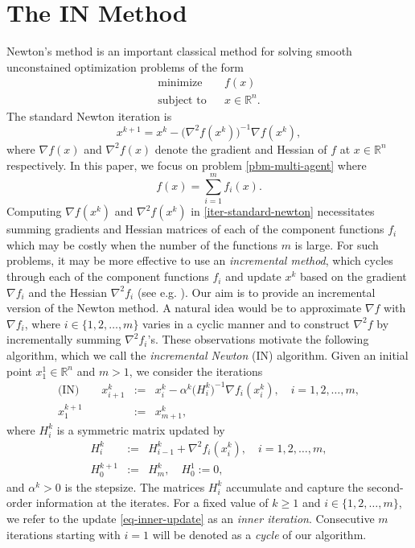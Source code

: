 \documentclass[final,numbook]{svjour3}
\begin{document}
\section{The IN Method}
\label{sec:incr-gauss-newton}
Newton's method is an important classical method for solving smooth unconstained optimization problems of the form   
  \begin{eqnarray*}\mbox{minimize  }&& f(x)  \\
	\mbox{subject to}&& x \in {\mathbb R}^n. \nonumber 
   \end{eqnarray*}
The standard Newton iteration is
  \begin{equation}\label{iter-standard-newton} x^{k+1} = x^k - \big(\nabla^2 f(x^k)\big)^{-1} \nabla f(x^k),
  \end{equation}
where $\nabla f(x)$ and $\nabla^2 f(x)$ denote the gradient and Hessian of $f$ at $x \in {\mathbb R}^n$ respectively. In this paper, we focus on problem \eqref{pbm-multi-agent} where  
  $$ f(x) = \sum_{i=1}^m f_i(x).$$
Computing $\nabla f(x^k)$ and $\nabla^2 f(x^k)$ in \eqref{iter-standard-newton}
necessitates summing gradients and Hessian matrices of each of the component functions $f_i$ which may be costly when the number of the functions $m$ is large. For such problems, it may be more effective to use an \textit{incremental method}, which cycles through each of the component functions $f_i$ and update $x^k$ based on the gradient $\nabla f_i$ and the Hessian $\nabla^2 f_i$ (see e.g. \cite{Bertsekas99nonlinear}).  
Our aim is to provide an incremental version of the Newton method. 
A natural idea would be to approximate $\nabla f$ with $\nabla f_i$, where $i \in \{1,2,\dots,m\}$ varies in a cyclic manner and to construct $\nabla^2 f$ by incrementally summing $\nabla^2 f_i$'s. These observations motivate the following algorithm, which we call the \textit{incremental Newton} (IN) algorithm. Given an initial point $x_1^1 \in {\mathbb R}^n$ and $m>1$, we consider the iterations   
      \begin{eqnarray}\label{eq-inner-update} \mbox{(IN)} \quad \quad x_{i+1}^k &:=& x_i^k - \alpha^k \big( H_i^k \big)^{-1}  \nabla f_i(x_i^k), \quad i = 1, 2, \dots,m, \\
	x_1^{k+1} &:=& x_{m+1}^k, \label{eq-inner-update-convention}
	\end{eqnarray}
where $H_i^k$ is a symmetric matrix updated by 
\begin{eqnarray} \label{eq-hessian-update} H_i^k &:=&  H_{i-1}^k + \nabla^2 f_i(x_i^k), \quad i = 1, 2, \dots,m,\\
     H_0^{k+1} &:=& H_{m}^k, \quad H_0^1 := 0, \label{eq-hessian-update-convention}
\end{eqnarray}
and $\alpha^k>0$ is the stepsize. The matrices $H_i^k$ accumulate and capture the second-order information at the iterates. For a fixed value of $k\geq 1$ and $i \in \{1,2,\dots,m\}$, we refer to the update \eqref{eq-inner-update} as an \textit{inner iteration}.  Consecutive $m$ iterations starting with $i=1$  will be denoted as a \textit{cycle} of our algorithm.
 
\end{document}
